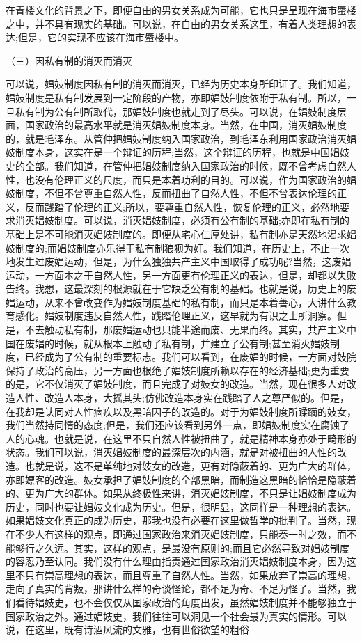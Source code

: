 \documentclass[
    a4paper
    ]{article}
\begin{document}
在青楼文化的背景之下，即便自由的男女关系成为可能，它也只是呈现在海市蜃楼之中，并不具有现实的基础。可以说，在自由的男女关系这里，有着人类理想的表达;但是，它的实现不应该在海市蜃楼中。　　

（三）因私有制的消灭而消灭

可以说，娼妓制度因私有制的消灭而消灭，已经为历史本身所印证了。我们知道，娼妓制度是私有制发展到一定阶段的产物，亦即娼妓制度依附于私有制。所以，一旦私有制为公有制所取代，那娼妓制度也就走到了尽头。可以说，在娼妓制度层面，国家政治的最高水平就是消灭娼妓制度本身。当然，在中国，消灭娼妓制度的，就是毛泽东。从管仲把娼妓制度纳入国家政治，到毛泽东利用国家政治消灭娼妓制度本身，这实在是一个辩证的历程;当然，这个辩证的历程，也就是中国娼妓史的全部。我们知道，在管仲把娼妓制度纳入国家政治的时候，既不曾考虑自然人性，也没有伦理正义的尺度，而只是本着功利的目的。可以说，作为国家政治的娼妓制度，不但不曾尊重自然人性，反而扭曲了自然人性，不但不曾表达伦理的正义，反而践踏了伦理的正义;所以，要尊重自然人性，恢复伦理的正义，必然地要求消灭娼妓制度。可以说，消灭娼妓制度，必须有公有制的基础;亦即在私有制的基础上是不可能消灭娼妓制度的。即便从宅心仁厚处讲，私有制亦是天然地渴求娼妓制度的;而娼妓制度亦乐得于私有制狼狈为奸。我们知道，在历史上，不止一次地发生过废娼运动，但是，为什么独独共产主义中国取得了成功呢?当然，这废娼运动，一方面本之于自然人性，另一方面更有伦理正义的表达，但是，却都以失败告终。我想，这最深刻的根源就在于它缺乏公有制的基础。也就是说，历史上的废娼运动，从来不曾改变作为娼妓制度基础的私有制，而只是本着善心，大讲什么教育感化。娼妓制度违反自然人性，践踏伦理正义，这早就为有识之士所洞察。但是，不去触动私有制，那废娼运动也只能半途而废、无果而终。其实，共产主义中国在废娼的时候，就从根本上触动了私有制，并建立了公有制;甚至消灭娼妓制度，已经成为了公有制的重要标志。我们可以看到，在废娼的时候，一方面对妓院保持了政治的高压，另一方面也根绝了娼妓制度所赖以存在的经济基础;更为重要的是，它不仅消灭了娼妓制度，而且完成了对妓女的改造。当然，现在很多人对改造人性、改造人本身，大摇其头;仿佛改造本身实在践踏了人之尊严似的。但是，在我却是认同对人性痼疾以及黑暗因子的改造的。对于为娼妓制度所蹂躏的妓女，我们当然持同情的态度;但是，我们还应该看到另外一点，即娼妓制度实在腐蚀了人的心魂。也就是说，在这里不只自然人性被扭曲了，就是精神本身亦处于畸形的状态。我们可以说，消灭娼妓制度的最深层次的内涵，就是对被扭曲的人性的改造。也就是说，这不是单纯地对妓女的改造，更有对隐蔽着的、更为广大的群体，亦即嫖客的改造。妓女承担了娼妓制度的全部黑暗，而制造这黑暗的恰恰是隐蔽着的、更为广大的群体。如果从终极性来讲，消灭娼妓制度，不只是让娼妓制度成为历史，同时也要让娼妓文化成为历史。但是，很明显，这同样是一种理想的表达。如果娼妓文化真正的成为历史，那我也没有必要在这里做哲学的批判了。当然，现在不少人有这样的观点，即通过国家政治来消灭娼妓制度，只能奏一时之效，而不能够行之久远。其实，这样的观点，是最没有原则的;而且它必然导致对娼妓制度的容忍乃至认同。我们没有什么理由指责通过国家政治消灭娼妓制度本身，因为这里不只有崇高理想的表达，而且尊重了自然人性。当然，如果放弃了崇高的理想，走向了真实的背叛，那讲什么样的奇谈怪论，都不足为奇、不足为怪了。当然，我们看待娼妓史，也不会仅仅从国家政治的角度出发，虽然娼妓制度并不能够独立于国家政治之外。通过娼妓史，我们往往可以洞见一个社会最为真实的情形。可以说，在这里，既有诗酒风流的文雅，也有世俗欲望的粗俗
\end{document}
